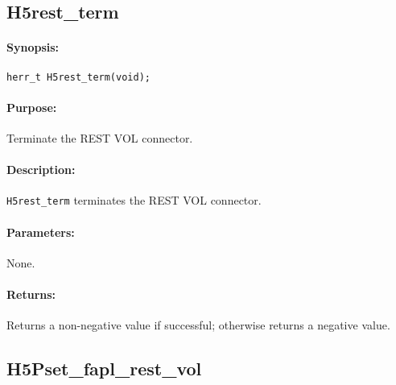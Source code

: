\documentclass[../users_guide.tex]{subfiles}
\begin{document}
\newpage
\subsection{H5rest\_term}
\label{ref:h5rest_term}

\paragraph{Synopsis:}
\begin{flushleft}%
\begin{verbatim}
herr_t H5rest_term(void);
\end{verbatim}
\end{flushleft}%

\paragraph{Purpose:}
\begin{flushleft}%
Terminate the REST VOL connector.
\end{flushleft}%

\paragraph{Description:}
\begin{flushleft}%
\texttt{H5rest\_term} terminates the REST VOL connector.
\end{flushleft}%

\paragraph{Parameters:}
\begin{flushleft}%
None.
\end{flushleft}%

\paragraph{Returns:}
\begin{flushleft}%
Returns a non-negative value if successful; otherwise returns a negative value.
\end{flushleft}%

\newpage
\subsection{H5Pset\_fapl\_rest\_vol}
\label{ref:h5pset_fapl_rest_vol}
\end{document}
